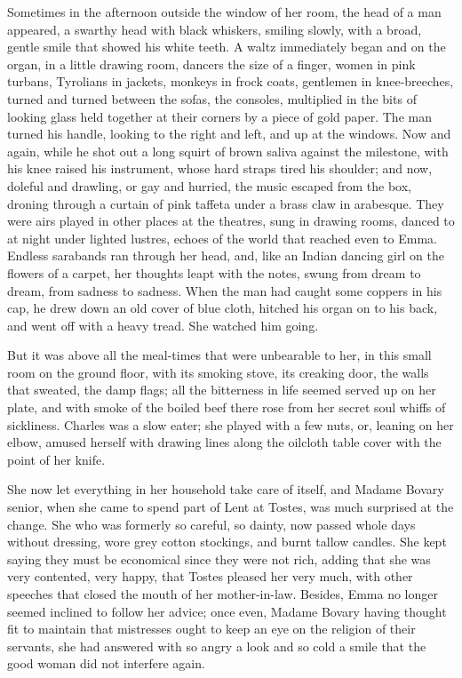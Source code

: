 \documentclass[11pt,twocolumn]{ltugboat}
\begin{document}
Sometimes in the afternoon outside the window of her room, the head of a
man appeared, a swarthy head with black whiskers, smiling slowly, with
a broad, gentle smile that showed his white teeth. A waltz immediately
began and on the organ, in a little drawing room, dancers the size of
a finger, women in pink turbans, Tyrolians in jackets, monkeys in frock
coats, gentlemen in knee-breeches, turned and turned between the sofas,
the consoles, multiplied in the bits of looking glass held together
at their corners by a piece of gold paper. The man turned his handle,
looking to the right and left, and up at the windows. Now and again,
while he shot out a long squirt of brown saliva against the milestone,
with his knee raised his instrument, whose hard straps tired his
shoulder; and now, doleful and drawling, or gay and hurried, the music
escaped from the box, droning through a curtain of pink taffeta under
a brass claw in arabesque. They were airs played in other places at
the theatres, sung in drawing rooms, danced to at night under lighted
lustres, echoes of the world that reached even to Emma. Endless
sarabands ran through her head, and, like an Indian dancing girl on the
flowers of a carpet, her thoughts leapt with the notes, swung from dream
to dream, from sadness to sadness. When the man had caught some coppers
in his cap, he drew down an old cover of blue cloth, hitched his organ
on to his back, and went off with a heavy tread. She watched him going.

But it was above all the meal-times that were unbearable to her, in this
small room on the ground floor, with its smoking stove, its creaking
door, the walls that sweated, the damp flags; all the bitterness in life
seemed served up on her plate, and with smoke of the boiled beef there
rose from her secret soul whiffs of sickliness. Charles was a slow
eater; she played with a few nuts, or, leaning on her elbow, amused
herself with drawing lines along the oilcloth table cover with the point
of her knife.

She now let everything in her household take care of itself, and Madame
Bovary senior, when she came to spend part of Lent at Tostes, was much
surprised at the change. She who was formerly so careful, so dainty,
now passed whole days without dressing, wore grey cotton stockings, and
burnt tallow candles. She kept saying they must be economical since
they were not rich, adding that she was very contented, very happy, that
Tostes pleased her very much, with other speeches that closed the mouth
of her mother-in-law. Besides, Emma no longer seemed inclined to follow
her advice; once even, Madame Bovary having thought fit to maintain that
mistresses ought to keep an eye on the religion of their servants, she
had answered with so angry a look and so cold a smile that the good
woman did not interfere again.
\end{document}
